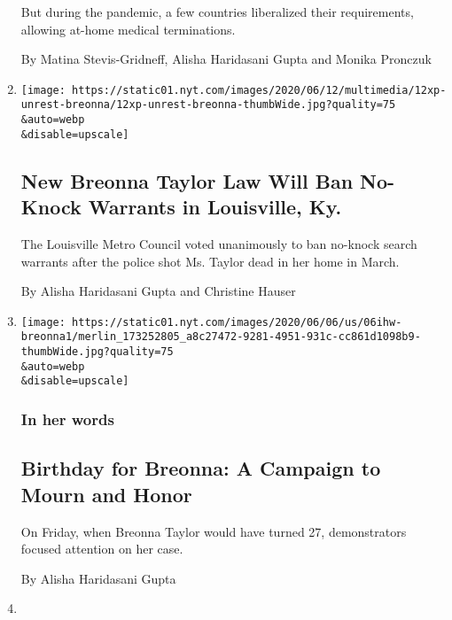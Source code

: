 \begin{enumerate}
  But during the pandemic, a few countries liberalized their
  requirements, allowing at-home medical terminations.

  By Matina Stevis-Gridneff, Alisha Haridasani Gupta and Monika Pronczuk
\item
  \href{/2020/06/12/us/breonna-taylor-law-passed.html}{}

  \texttt{[image: https://static01.nyt.com/images/2020/06/12/multimedia/12xp-unrest-breonna/12xp-unrest-breonna-thumbWide.jpg?quality=75\\\&auto=webp\\\&disable=upscale]}

  \hypertarget{new-breonna-taylor-law-will-ban-no-knock-warrants-in-louisville-ky}{%
  \subsection{New Breonna Taylor Law Will Ban No-Knock Warrants in
  Louisville,
  Ky.}\label{new-breonna-taylor-law-will-ban-no-knock-warrants-in-louisville-ky}}

  The Louisville Metro Council voted unanimously to ban no-knock search
  warrants after the police shot Ms. Taylor dead in her home in March.

  By Alisha Haridasani Gupta and Christine Hauser
\item
  \href{/2020/06/06/us/birthday-breonna-taylor-black-lives-matter.html}{}

  \texttt{[image: https://static01.nyt.com/images/2020/06/06/us/06ihw-breonna1/merlin\_173252805\_a8c27472-9281-4951-931c-cc861d1098b9-thumbWide.jpg?quality=75\\\&auto=webp\\\&disable=upscale]}

  \hypertarget{in-her-words-3}{%
  \subsubsection{In her words}\label{in-her-words-3}}

  \hypertarget{birthday-for-breonna-a-campaign-to-mourn-and-honor}{%
  \subsection{Birthday for Breonna: A Campaign to Mourn and
  Honor}\label{birthday-for-breonna-a-campaign-to-mourn-and-honor}}

  On Friday, when Breonna Taylor would have turned 27, demonstrators
  focused attention on her case.

  By Alisha Haridasani Gupta
\item
  \href{/2020/06/05/us/coronavirus-who-samantha-power-un.html}{}


\end{enumerate}
